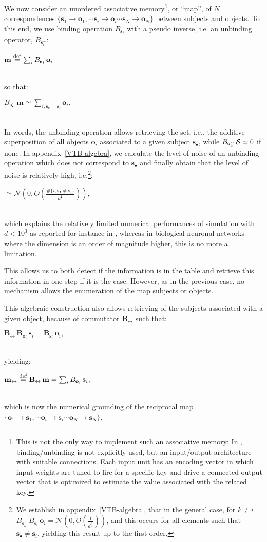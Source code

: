 \documentclass[sn-mathphys]{sn-jnl}
\newcommand{\defq}{\stackrel {\rm def}{=}}
\newcommand{\eqline}[1]{~\vspace{0.1cm}\\\centerline{$#1$}\vspace{0.1cm}\\}
\begin{document}
We now consider an unordered associative memory\footnote{This is not the only way to implement such an associative memory: In \cite{voelker_learning_2014}, binding/unbinding is not explicitly used, but an input/output architecture with suitable connections. Each input unit has an encoding vector in which input weights are tuned to fire for a specific key and drive a connected output vector that is optimized to estimate the value associated with the related key.}, or ``map'', of $N$ correspondences $\{\mathbf{s}_1 \rightarrow \mathbf{o}_1, \cdots \mathbf{s}_i \rightarrow \mathbf{o}_i \cdots \mathbf{s}_N \rightarrow \mathbf{o}_N\}$ between subjects and objects. To this end, we use binding operation $B_{\mathbf{s}_i}$ with a pseudo inverse, i.e. an unbinding operator, $B_{\mathbf{s}_i^\sim}$:
\eqline{\mathbf{m} \defq \sum_i B_{\mathbf{s}_i} \, \mathbf{o}_i}
so that:
\eqline{B_{\mathbf{s}_\bullet^\sim} \, \mathbf{m} \simeq \sum_{i, \mathbf{s}_\bullet = \mathbf{s}_i} \mathbf{o}_i.}
In words, the unbinding operation allows retrieving the set, i.e., the additive superposition of all objects $\mathbf{o}_i$ associated to a given subject $\mathbf{s}_\bullet$, while $B_{\mathbf{s}_k^\sim} \, {\cal S} \simeq 0$ if none.
In appendix~\ref{VTB-algebra}, we calculate the level of noise of an unbinding operation which does not correspond to $\mathbf{s}_\bullet$ and finally obtain that the level of noise is relatively high, i.e.\footnote{We establish in appendix~\ref{VTB-algebra}, that in the general case, for $k \neq i$ $B_{\mathbf{s}_k^\sim} \, B_{\mathbf{s}_i} \, \mathbf{o}_i = {\mathcal N}\left(0, O\left(\frac{1}{d^{\frac{1}{4}}}\right)\right)$, and this occurs for all elements such that $\mathbf{s}_\bullet \neq \mathbf{s}_i$, yielding this result up to the first order.}:
\eqline{\simeq {\mathcal N}\left(0, O\left(\frac{\#\{i, \mathbf{s}_\bullet \neq \mathbf{s}_i \}}{d^{\frac{1}{4}}}\right)\right),}
which explains the relatively limited numerical performances of simulation with $d< 10^3$ as reported for instance in \cite{schlegel_comparison_2020}, whereas in biological neuronal networks where the dimension is an order of magnitude higher, this is no more a limitation.

This allows us to both detect if the information is in the table and retrieve this information in one step if it is the case. However, as in the previous case, no mechanism allows the enumeration of the map subjects or objects.

This algebraic construction also allows retrieving of the subjects associated with a given object, because of commutator $\mathbf{B_{\leftrightarrow}}$ such that:
\eqline{\mathbf{B_{\leftrightarrow}} \, \mathbf{B}_{\mathbf{o}_i} \, \mathbf{s}_i = \mathbf{B}_{\mathbf{s}_i} \, \mathbf{o}_i,}
yielding:
\eqline{\mathbf{m_{\leftrightarrow}} \defq \mathbf{B_{\leftrightarrow}} \, \mathbf{m} = \sum_i B_{\mathbf{o}_i} \, \mathbf{s}_i,}
which is now the numerical grounding of the reciprocal map $\{\mathbf{o}_1 \rightarrow \mathbf{s}_1, \cdots \mathbf{o}_i \rightarrow \mathbf{s}_i \cdots \mathbf{o}_N \rightarrow \mathbf{s}_N\}$.
\end{document}
